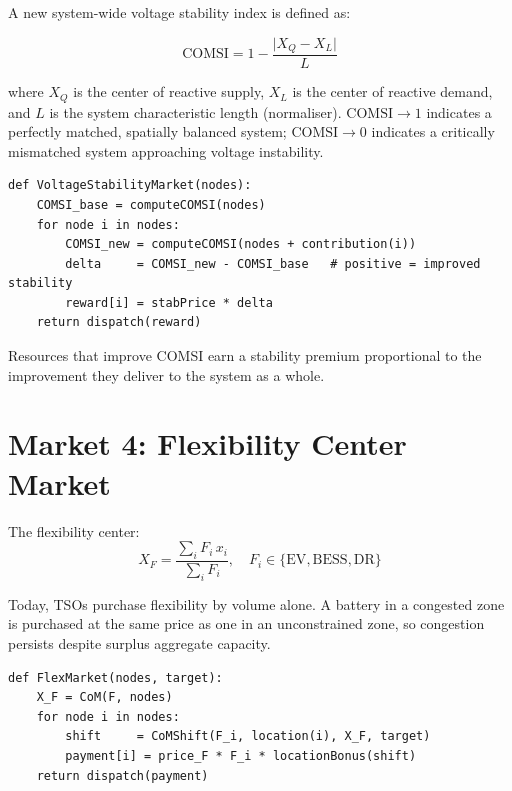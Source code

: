 \documentclass[12pt, a4paper]{article}
\begin{document}
A new system-wide voltage stability index is defined as:

\begin{equation}
  \mathrm{COMSI} = 1 - \frac{\lvert X_Q - X_L \rvert}{L}
  \label{eq:comsi}
\end{equation}

where $X_Q$ is the center of reactive supply, $X_L$ is the center of reactive
demand, and $L$ is the system characteristic length (normaliser).
$\mathrm{COMSI} \to 1$ indicates a perfectly matched, spatially balanced system;
$\mathrm{COMSI} \to 0$ indicates a critically mismatched system approaching
voltage instability.

\begin{lstlisting}[caption={Voltage Stability Market via COMSI},
                   label={lst:comsi}]
def VoltageStabilityMarket(nodes):
    COMSI_base = computeCOMSI(nodes)
    for node i in nodes:
        COMSI_new = computeCOMSI(nodes + contribution(i))
        delta     = COMSI_new - COMSI_base   # positive = improved stability
        reward[i] = stabPrice * delta
    return dispatch(reward)
\end{lstlisting}

Resources that improve COMSI earn a stability premium proportional to the
improvement they deliver to the system as a whole.

\section{Market 4: Flexibility Center Market}
\label{sec:flex_market}

The flexibility center:
\begin{equation}
  X_F = \frac{\sum_i F_i\, x_i}{\sum_i F_i}, \quad
  F_i \in \{\text{EV}, \text{BESS}, \text{DR}\}
\end{equation}

Today, TSOs purchase flexibility by volume alone.
A battery in a congested zone is purchased at the same price as one in an
unconstrained zone, so congestion persists despite surplus aggregate capacity.

\begin{lstlisting}[caption={Flexibility Center Market dispatch},
                   label={lst:flex}]
def FlexMarket(nodes, target):
    X_F = CoM(F, nodes)
    for node i in nodes:
        shift     = CoMShift(F_i, location(i), X_F, target)
        payment[i] = price_F * F_i * locationBonus(shift)
    return dispatch(payment)
\end{lstlisting}
\end{document}

